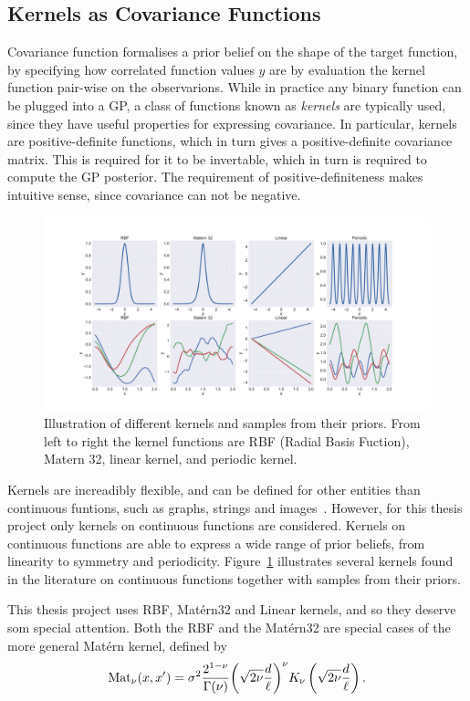 \subsection{Kernels as Covariance Functions}\label{sec:kernels-as-priors}
Covariance function formalises a prior belief on the shape of the target
function, by specifying how correlated function values $y$ are by
evaluation the kernel function pair-wise on the observarions. 
While in practice any binary function can be plugged into
a GP, a class of functions known as \textit{kernels} are typically
used, since they have useful properties for expressing covariance. In
particular, kernels are positive-definite functions, which in turn
gives a positive-definite covariance matrix. This is required for it
to be invertable, which in turn is required to compute the GP
posterior. The requirement of positive-definiteness makes intuitive sense, since covariance can not
be negative. 
\begin{figure}
  \centering
  \includegraphics[width=\textwidth]{figures/kernel-priors-vert}
  \caption{Illustration of different kernels and samples from their
    priors. From left to right the kernel functions are RBF (Radial
    Basis Fuction), Matern 32, linear kernel, and periodic kernel.}\label{fig:kernel-priors}
\end{figure}
Kernels are increadibly flexible, and can be defined for other entities than continuous
funtions, such as graphs, strings and
images~\cite{duvenaud2013structure}. However, for this thesis project
only kernels on continuous functions are considered. Kernels on
continuous functions are able to express a wide range of prior beliefs, from linearity to symmetry and
periodicity. Figure~\ref{fig:kernel-priors} illustrates several kernels
found in the literature on continuous functions together with samples from their priors.

This thesis project uses RBF, Matérn32 and Linear kernels,
and so they deserve som special attention. Both the RBF and the Matérn32
are special cases of the more general Matérn kernel, defined by 
\begin{equation}
  \label{eq:matern-kernel}
  \text{Mat}_\nu(x, x') = \sigma^2
  \frac{2^{1-\nu}}{\Gamma(\nu)} {\left(
    \sqrt{2\nu}\frac{d}{\ell}\right)}^\nu K_\nu
  \left(\sqrt{2\nu
  }\frac{d}{\ell}\right).
\end{equation}
 
